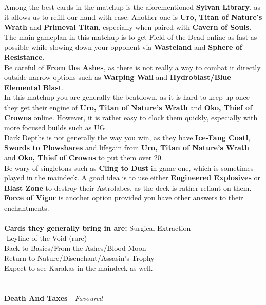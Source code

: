 \documentclass{report}
\begin{document}
Among the best cards in the matchup is the aforementioned \textbf{Sylvan Library}, as it allows us to refill our hand with ease. Another one is \textbf{Uro, Titan of Nature's Wrath} and \textbf{Primeval Titan}, especially when paired with \textbf{Cavern of Souls}. The main gameplan in this matchup is to get Field of the Dead online as fast as possible while slowing down your opponent via \textbf{Wasteland} and \textbf{Sphere of Resistance}.\\ Be careful of \textbf{From the Ashes}, as there is not really a way to combat it directly outside narrow options such as \textbf{Warping Wail} and \textbf{Hydroblast/Blue Elemental Blast}.\\ In this matchup you are generally the beatdown, as it is hard to keep up once they get their engine of \textbf{Uro, Titan of Nature's Wrath} and \textbf{Oko, Thief of Crowns} online. However, it is rather easy to clock them quickly, especially with more focused builds such as UG.\\ Dark Depths is not generally the way you win, as they have \textbf{Ice-Fang Coatl}, \textbf{Swords to Plowshares} and lifegain from \textbf{Uro, Titan of Nature's Wrath} and \textbf{Oko, Thief of Crowns} to put them over 20.\\
Be wary of singletons such as \textbf{Cling to Dust} in game one, which is sometimes played in the maindeck. A good idea is to use either \textbf{Engineered Explosives} or \textbf{Blast Zone} to destroy their Astrolabes, as the deck is rather reliant on them. \textbf{Force of Vigor} is another option provided you have other answers to their enchantments.\\\\
\textbf{Cards they generally bring in are:}
Surgical Extraction\\-Leyline of the Void (rare)\\Back to Basics/From the Ashes/Blood Moon\\Return to Nature/Disenchant/Assasin's Trophy\\
Expect to see Karakas in the maindeck as well.\\\\\\
\textbf{Death And Taxes} - \emph{Favoured}\\
\end{document}
